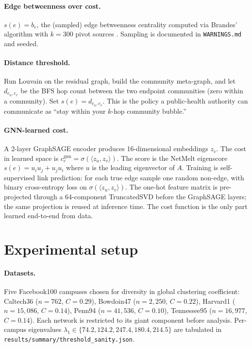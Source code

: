 \documentclass{article}
\begin{document}
\paragraph{Edge betweenness over cost.} $s(e) = b_e$, the (sampled)
edge betweenness centrality computed via Brandes' algorithm with
$k = 300$ pivot sources \citep{tong2012netmelt}. Sampling is
documented in \texttt{WARNINGS.md} and seeded.

\paragraph{Distance threshold.} Run Louvain
\citep{blondel2008louvain} on the residual graph, build the community
meta-graph, and let $d_{c_u, c_v}$ be the BFS hop count between the
two endpoint communities (zero within a community). Set
$s(e) = d_{c_u, c_v}$. This is the policy a public-health authority
can communicate as ``stay within your $k$-hop community bubble.''

\paragraph{GNN-learned cost.} A 2-layer GraphSAGE encoder
\citep{hamilton2017graphsage} produces 16-dimensional embeddings
$z_v$. The cost in learned space is
$c_e^{\mathrm{gnn}} = \sigma(\langle z_u, z_v \rangle)$. The score is
the NetMelt eigenscore $s(e) = u_i u_j + u_j u_i$ where $u$ is the
leading eigenvector of $A$. Training is self-supervised link
prediction: for each true edge sample one random non-edge, with
binary cross-entropy loss on $\sigma(\langle z_u, z_v \rangle)$.
The one-hot feature matrix is pre-projected through a 64-component
TruncatedSVD before the GraphSAGE layers; the same projection is
reused at inference time. The cost function is the only part learned
end-to-end from data.

\section{Experimental setup}
\label{sec:setup}

\paragraph{Datasets.} Five Facebook100 campuses chosen for diversity in
global clustering coefficient: Caltech36 ($n=762$, $C=0.29$),
Bowdoin47 ($n=2{,}250$, $C=0.22$), Harvard1 ($n=15{,}086$, $C=0.14$),
Penn94 ($n=41{,}536$, $C=0.10$), Tennessee95 ($n=16{,}977$,
$C=0.14$). Each network is restricted to its giant component before
analysis. Per-campus eigenvalues
$\lambda_1 \in \{74.2, 124.2, 247.4, 180.4, 214.5\}$ are tabulated in
\texttt{results/summary/threshold\_sanity.json}.
\end{document}
